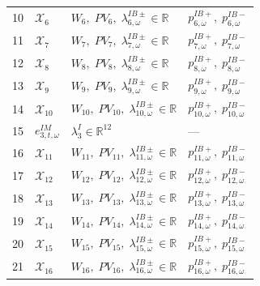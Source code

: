 \documentclass{article}
\begin{document}
\begin{longtable}{c p{5.5cm} p{4.2cm} p{3.8cm}}
10  & $\mathcal{X}_6$
    & $W_6,\;PV_6,\;\lambda^{IB\pm}_{6,\omega} \in \mathbb{R}$
    & $p^{IB+}_{6,\omega},\; p^{IB-}_{6,\omega}$ \\

11  & $\mathcal{X}_7$
    & $W_7,\;PV_7,\;\lambda^{IB\pm}_{7,\omega} \in \mathbb{R}$
    & $p^{IB+}_{7,\omega},\; p^{IB-}_{7,\omega}$ \\

12  & $\mathcal{X}_8$
    & $W_8,\;PV_8,\;\lambda^{IB\pm}_{8,\omega} \in \mathbb{R}$
    & $p^{IB+}_{8,\omega},\; p^{IB-}_{8,\omega}$ \\

13  & $\mathcal{X}_9$
    & $W_9,\;PV_9,\;\lambda^{IB\pm}_{9,\omega} \in \mathbb{R}$
    & $p^{IB+}_{9,\omega},\; p^{IB-}_{9,\omega}$ \\

14  & $\mathcal{X}_{10}$
    & $W_{10},\;PV_{10},\;\lambda^{IB\pm}_{10,\omega} \in \mathbb{R}$
    & $p^{IB+}_{10,\omega},\; p^{IB-}_{10,\omega}$ \\

15
  & $e^{IM}_{3,t,\omega}$
  & $\lambda^I_3 \in \mathbb{R}^{12}$
  & --- \\

16  & $\mathcal{X}_{11}$
    & $W_{11},\;PV_{11},\;\lambda^{IB\pm}_{11,\omega} \in \mathbb{R}$
    & $p^{IB+}_{11,\omega},\; p^{IB-}_{11,\omega}$ \\

17  & $\mathcal{X}_{12}$
    & $W_{12},\;PV_{12},\;\lambda^{IB\pm}_{12,\omega} \in \mathbb{R}$
    & $p^{IB+}_{12,\omega},\; p^{IB-}_{12,\omega}$ \\

18  & $\mathcal{X}_{13}$
    & $W_{13},\;PV_{13},\;\lambda^{IB\pm}_{13,\omega} \in \mathbb{R}$
    & $p^{IB+}_{13,\omega},\; p^{IB-}_{13,\omega}$ \\

19  & $\mathcal{X}_{14}$
    & $W_{14},\;PV_{14},\;\lambda^{IB\pm}_{14,\omega} \in \mathbb{R}$
    & $p^{IB+}_{14,\omega},\; p^{IB-}_{14,\omega}$ \\

20  & $\mathcal{X}_{15}$
    & $W_{15},\;PV_{15},\;\lambda^{IB\pm}_{15,\omega} \in \mathbb{R}$
    & $p^{IB+}_{15,\omega},\; p^{IB-}_{15,\omega}$ \\

21  & $\mathcal{X}_{16}$
    & $W_{16},\;PV_{16},\;\lambda^{IB\pm}_{16,\omega} \in \mathbb{R}$
    & $p^{IB+}_{16,\omega},\; p^{IB-}_{16,\omega}$ \\


\end{longtable}
\end{document}
